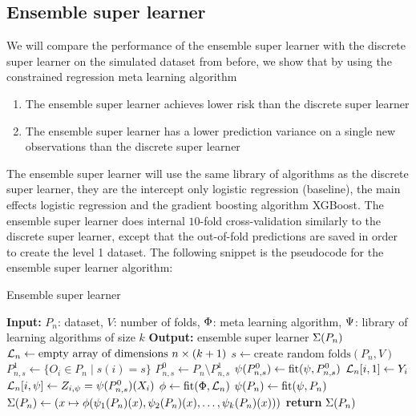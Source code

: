 \documentclass[./main.tex]{subfiles}
\begin{document}
\subsection{Ensemble super learner}
We will compare the performance of the ensemble super learner with the discrete super learner on the simulated dataset from before, we show that by using the constrained regression meta learning algorithm
\begin{enumerate}
    \item The ensemble super learner achieves lower risk than the discrete super learner
    \item The ensemble super learner has a lower prediction variance on a single new observations than the discrete super learner
\end{enumerate}

The ensemble super learner will use the same library of algorithms as the discrete super learner, they are the intercept only logistic regression (baseline), the main effects logistic regression and the gradient boosting algorithm XGBoost. The ensemble super learner does internal $ 10 $-fold cross-validation similarly to the discrete super learner, except that the out-of-fold predictions are saved in order to create the level 1 dataset. The following snippet is the pseudocode for the ensemble super learner algorithm:
\begin{algorithm}[H]
\caption{Ensemble super learner}
\begin{algorithmic}[1]
\State \textbf{Input:} $P_n$: dataset, $V$: number of folds, $ \Phi $: meta learning algorithm, $ \Psi $: library of learning algorithms of size $ k $
\State \textbf{Output:} ensemble super learner $ \Sigma(P_n) $
\State $\mathcal{L}_n \gets \text{empty array of dimensions } n \times (k+1)$  
\State $s \gets \text{create random folds}(P_n, V)$ 
    \State $P_{n, s}^{1} \gets \{O_i \in P_n \mid s(i) = s\} $
    \State $P_{n, s}^{0} \gets P_n \setminus P_{n,s}^{1} $
    \For{$\la \in \lib$}
        \State $ \psi(P_{n,s}^{0}) \gets \text{fit}(\psi, P_{n, s}^{0})$
            \State $ \mathcal{L}_n[i, 1] \gets Y_i $ 
            \State $ \mathcal{L}_n[i, \psi] \gets Z_{i, \psi} = \psi(P_{n,s}^{0})(X_i) $ 
        \EndFor
    \EndFor
\EndFor
\State $ \phi \gets \text{fit}(\Phi, \mathcal{L}_n) $ 
\For{$\la \in \lib$}
    \State $ \psi(P_{n}) \gets \text{fit}(\psi, P_{n})$ 
\EndFor
\State $ \Sigma(P_n) \gets (x \mapsto \phi(\psi_1(P_n)(x), \psi_2(P_n)(x), \dots , \psi_{k}(P_n)(x))) $ 
\State \textbf{return} $ \Sigma(P_n) $
\end{algorithmic}
\end{algorithm}
\end{document}
